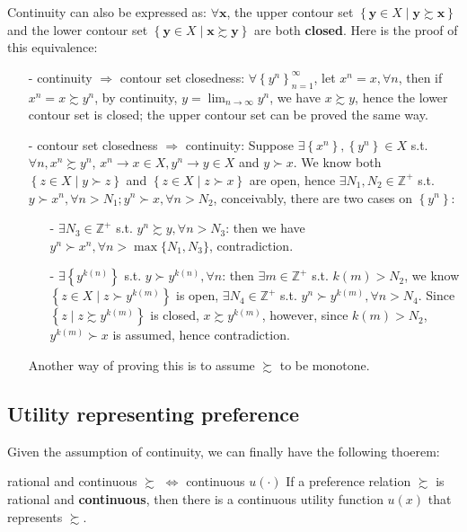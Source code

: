 Continuity can also be expressed as: $\forall \mathbf{x}$, the upper contour set $\left\{\mathbf{y}\in X\mid \mathbf{y}\succsim \mathbf{x} \right\}$ and the lower contour set $\left\{\mathbf{y}\in X\mid \mathbf{x}\succsim \mathbf{y} \right\}$ are both \textbf{closed}. Here is the proof of this equivalence: 
\begin{enumerate}
    \item[-] continuity $\Rightarrow$ contour set closedness: $\forall \left\{y^n\right\}^{\infty}_{n=1}$, let $x^n=x,\forall n$, then if $x^n=x\succsim y^n$, by continuity, $y=\lim_{n\rightarrow \infty}y^n$, we have $x\succsim y$, hence the lower contour set is closed; the upper contour set can be proved the same way.
    \item[-] contour set closedness $\Rightarrow$ continuity: Suppose $\exists \left\{x^n\right\},\left\{y^n\right\}\in X$ s.t. $\forall n, x^n\succsim y^n$, $x^n\rightarrow x\in X, y^n\rightarrow y\in X$ and $y\succ x$. We know both $\left\{z\in X\mid y\succ z \right\}$ and $\left\{z\in X\mid z\succ x \right\}$ are open, hence $\exists N_1,N_2\in \mathbb{Z}^+$ s.t. $y\succ x^n,\forall n>N_1; y^n\succ x,\forall n>N_2$, conceivably, there are two cases on $\left\{y^n\right\}$:
    \begin{enumerate}
        \item[-] $\exists N_3 \in \mathbb{Z}^+$ s.t. $y^n\succsim y, \forall n>N_3$: then we have $y^n\succ x^n,\forall n>\max\{N_1,N_3\}$, contradiction.
        \item[-] $\exists \left\{y^{k(n)}\right\}$ s.t. $y\succ y^{k(n)},\forall n$: then $\exists m\in \mathbb{Z}^+$ s.t. $k(m)>N_2$, we know $\left\{z\in X\mid z\succ y^{k(m)}\right\}$ is open, $\exists N_4\in \mathbb{Z}^+$ s.t. $y^n\succ y^{k(m)}, \forall n>N_4$. Since $\left\{z\mid z\succsim y^{k(m)}\right\}$ is closed, $x\succsim y^{k(m)}$, however, since $k(m)>N_2$, $y^{k(m)}\succ x$ is assumed, hence contradiction.
    \end{enumerate} 
    Another way of proving this is to assume $\succsim$ to be monotone.
\end{enumerate}

\subsection{Utility representing preference}
Given the assumption of continuity, we can finally have the following thoerem:
\begin{theorem}{rational and continuous $\succsim$ $\Leftrightarrow$ continuous $u(\cdot)$}{}
    If a preference relation $\succsim$ is rational and \textbf{continuous}, then there is a continuous utility function $u(x)$ that represents $\succsim$.
\end{theorem}

